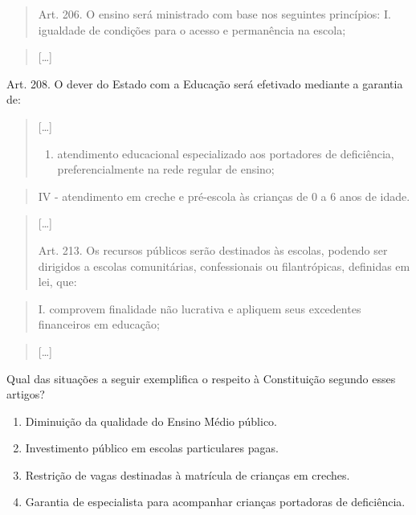 \begin{quote}
Art. 206. O ensino será ministrado com base nos seguintes princípios: I.
igualdade de condições para o acesso e permanência na escola;
\end{quote}

\begin{quote}
{[}\ldots{}{]}
\end{quote}

Art. 208. O dever do Estado com a Educação será efetivado mediante a
garantia de:

\begin{quote}
{[}\ldots{}{]}

\begin{enumerate}
\def\labelenumi{\Roman{enumi}.}
\setcounter{enumi}{2}
\tightlist
\item
  atendimento educacional especializado aos portadores de deficiência,
  preferencialmente na rede regular de ensino;
\end{enumerate}
\end{quote}

\begin{quote}
IV - atendimento em creche e pré-escola às crianças de 0 a 6 anos de
idade.
\end{quote}

\begin{quote}
{[}\ldots{}{]}

Art. 213. Os recursos públicos serão destinados às escolas, podendo ser
dirigidos a escolas comunitárias, confessionais ou filantrópicas,
definidas em lei, que:
\end{quote}

\begin{quote}
I. comprovem finalidade não lucrativa e apliquem seus excedentes
financeiros em educação;
\end{quote}

\begin{quote}
{[}\ldots{}{]}
\end{quote}

Qual das situações a seguir exemplifica o respeito à Constituição
segundo esses artigos?

\begin{enumerate}
\def\labelenumi{\alph{enumi})}
\item
  Diminuição da qualidade do Ensino Médio público.
\item
  Investimento público em escolas particulares pagas.
\item
  Restrição de vagas destinadas à matrícula de crianças em creches.
\item
  Garantia de especialista para acompanhar crianças portadoras de
  deficiência.
\end{enumerate}

